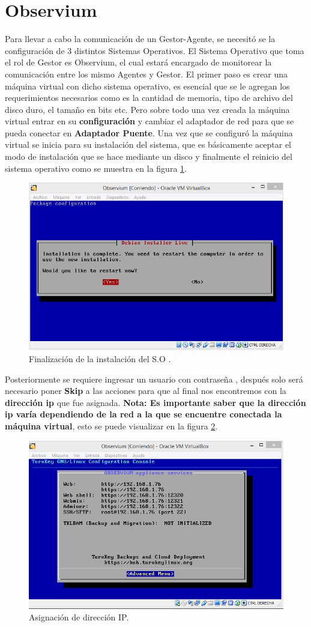 \section{Observium}

Para llevar a cabo la comunicación de un Gestor-Agente, se necesitó se la configuración de 3 distintos Sistemas Operativos. 
El Sistema Operativo que toma el rol de Gestor es Observium, el cual estará encargado de monitorear la comunicación entre los mismo Agentes y Gestor. El primer paso es crear una máquina virtual con dicho sistema operativo, es esencial que se le agregan los requerimientos necesarios como es la cantidad de memoria, tipo de archivo del disco duro, el tamaño en bits etc. Pero sobre todo una vez creada la máquina virtual entrar en su \textbf{configuración} y cambiar el adaptador de red para que se pueda conectar en \textbf{Adaptador Puente}.
Una vez que se configuró la máquina virtual se inicia para su instalación del sistema, que es básicamente aceptar el modo de instalación que se hace mediante un disco y finalmente el reinicio del sistema operativo como se muestra en la figura \ref{image:fin}.

\FloatBarrier
\begin{figure}[htbp!]
		\centering
		    \includegraphics[width=.5 \textwidth]{../images/1-Observium.png}
		\caption{Finalización de la instalación del S.O .}
		\label{image:fin}
\end{figure}
\FloatBarrier

Posteriormente se requiere ingresar un usuario con contraseña , después solo será necesario poner  \textbf{Skip} a las acciones para que al final nos encontremos con la  \textbf{dirección ip} que fue asignada.
 \textbf{Nota: Es importante saber que la dirección ip varía dependiendo de la red a la que se encuentre conectada la máquina virtual}, esto se puede visualizar en la figura \ref{image:ip}.

\FloatBarrier
\begin{figure}[htbp!]
		\centering
		    \includegraphics[width=.5 \textwidth]{../images/2-Observium.png} 
		\caption{Asignación de dirección IP.}
		\label{image:ip}
\end{figure}
\FloatBarrier

